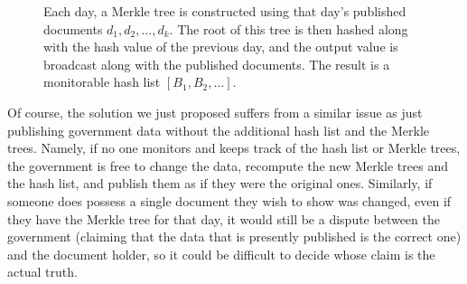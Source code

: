 \begin{figure}
\caption{Each day, a Merkle tree is constructed using that day's published documents $d_1,d_2,\dots, d_k$. The root of this tree is then hashed along with the hash value of the previous day, and the output value is broadcast along with the published documents. The result is a monitorable hash list $[B_1,B_2,\dots]$.}
\label{fig-merkle-chain}
\end{figure}



\medskip
{} Of course, the solution we just proposed suffers from a similar issue as just publishing government data without the additional hash list and the Merkle trees. Namely, if no one monitors and keeps track of the hash list or Merkle trees, the government is free to change the data, recompute the new Merkle trees and the hash list, and publish them as if they were the original ones. Similarly, if someone does possess a single document they wish to show was changed, even if they have the Merkle tree for that day, it would still be a dispute between the government (claiming that the data that is presently published is the correct one) and the document holder, so it could be difficult to decide whose claim is the actual truth.

